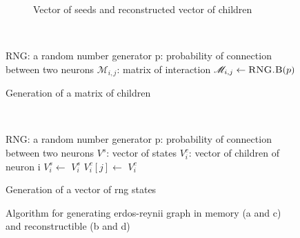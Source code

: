 \begin{figure}
\begin{subfigure}{.45\textwidth}
		\caption{Vector of seeds and reconstructed vector of children}\label{fig:vect}
	\end{subfigure}\\
	\centering\begin{subalgorithm}{\textwidth}
		\begin{algorithmic}[1]
			\State RNG: a random number generator
			\State p: probability of connection between two neurons
			\State $\mathscr{M}_{i,j}$: matrix of interaction
					\State $\mathscr{M}_{i,j}\gets\Call{RNG.B}{p}$
				\EndFor
			\EndFunction
		\end{algorithmic}
		\caption{Generation of a matrix of children}\label{alg:mat}
	\end{subalgorithm}\\
	\centering\begin{subalgorithm}{\textwidth}
		\begin{algorithmic}[1]
			\State RNG: a random number generator
			\State p: probability of connection between two neurons
			\State $V^s$: vector of states
			\State $V^c_i$: vector of children of neuron i
					\State $V^s_i\gets$
						\State {}
					\EndFor
				\EndFor
				\RETURN $V^s_i$
			\EndFunction
				\State {}
					\State $V^c_i[j]\gets$
				\EndFor
				\RETURN $V^c_i$
			\EndFunction
		\end{algorithmic}
		\caption{Generation of a vector of rng states}\label{alg:vect}
	\end{subalgorithm}
	\caption{Algorithm for generating erdos-reynii graph in memory (a and c) and reconstructible (b and d)}
	\label{fig:rec}
\end{figure}
